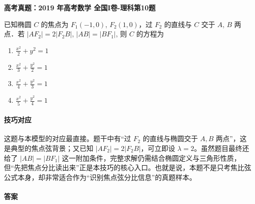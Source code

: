 \documentclass[UTF8,a4paper,11pt]{ctexart}
\newenvironment{gaokao}[1]{\par\medskip\noindent\textbf{高考真题：#1}\par\smallskip}{\par\medskip}
\begin{document}
\begin{gaokao}{2019 年高考数学 全国I卷-理科第10题}

已知椭圆 $C$ 的焦点为 $F_1(-1, 0)$, $F_2(1, 0)$，过 $F_2$ 的直线与 $C$ 交于 $A$, $B$ 两点．若 $|AF_2| = 2|F_2B|$, $|AB| = |BF_1|$, 则 $C$ 的方程为

\begin{enumerate}[label=\Alph*. ,itemsep=2pt]

\item $\frac{x^2}{2} + y^2 = 1$

\item $\frac{x^2}{3} + \frac{y^2}{2} = 1$

\item $\frac{x^2}{4} + \frac{y^2}{3} = 1$

\item $\frac{x^2}{5} + \frac{y^2}{4} = 1$

\end{enumerate}

\begin{center}


\end{center}

\paragraph{技巧对应}

这题与本模型的对应最直接。题干中有“过 $F_2$ 的直线与椭圆交于 $A,B$ 两点”，这是典型的焦点弦背景；又已知 $|AF_2|=2|F_2B|$，可立即设 $\lambda=2$。虽然题目最终还给了 $|AB|=|BF_1|$ 这一附加条件，完整求解仍需结合椭圆定义与三角形性质，但“先把焦点分比读出来”正是本技巧的核心入口。也就是说，本题不是只考焦比弦公式本身，却非常适合作为“识别焦点弦分比信息”的真题样本。

\paragraph{答案}


\end{gaokao}
\end{document}
